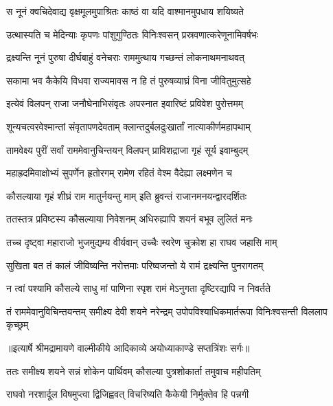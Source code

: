 \twolineshloka
{स नूनं क्वचिदेवाद्य वृक्षमूलमुपाश्रितः}
{काष्ठं वा यदि वाश्मानमुपधाय शयिष्यते} %

\twolineshloka
{उत्थास्यति च मेदिन्याः कृपणः पांशुगुण्ठितः}
{विनिःश्वसन् प्रस्रवणात्करेणूनामिवर्षभः} %

\twolineshloka
{द्रक्ष्यन्ति नूनं पुरुषा दीर्घबाहुं वनेचराः}
{राममुत्थाय गच्छन्तं लोकनाथमनाथवत्} %

\twolineshloka
{सकामा भव कैकेयि विधवा राज्यमावस}
{न हि तं पुरुषव्याघ्रं विना जीवितुमुत्सहे} %

\twolineshloka
{इत्येवं विलपन् राजा जनौघेनाभिसंवृतः}
{अपस्नात इवारिष्टं प्रविवेश पुरोत्तमम्} %

\twolineshloka
{शून्यचत्वरवेश्मान्तां संवृतापणदेवताम्}
{क्लान्तदुर्बलदुःखार्तां नात्याकीर्णमहापथाम्} %

\twolineshloka
{तामवेक्ष्य पुरीं सर्वां राममेवानुचिन्तयन्}
{विलपन् प्राविशद्राजा गृहं सूर्य इवाम्बुदम्} %

\twolineshloka
{महाह्रदमिवाक्षोभ्यं सुपर्णेन हृतोरगम्}
{रामेण रहितं वेश्म वैदेह्या लक्ष्मणेन च} %

\twolineshloka
{कौसल्याया गृहं शीघ्रं राम मातुर्नयन्तु माम्}
{इति ब्रुवन्तं राजानमनयन्द्वारदर्शितः} %

\twolineshloka
{ततस्तत्र प्रविष्टस्य कौसल्याया निवेशनम्}
{अधिरुह्यापि शयनं बभूव लुलितं मनः} %

\twolineshloka
{तच्च दृष्ट्वा महाराजो भुजमुद्यम्य वीर्यवान्}
{उच्चैः स्वरेण चुक्रोश हा राघव जहासि माम्} %

\twolineshloka
{सुखिता बत तं कालं जीविष्यन्ति नरोत्तमाः}
{परिष्वजन्तो ये रामं द्रक्ष्यन्ति पुनरागतम्} %

\twolineshloka
{न त्वां पश्यामि कौसल्ये साधु मां पाणिना स्पृश}
{रामं मेऽनुगता दृष्टिरद्यापि न निवर्तते} %

\fourlineindentedshloka
{तं राममेवानुविचिन्तयन्तम्}
{समीक्ष्य देवी शयने नरेन्द्रम्}
{उपोपविश्याधिकमार्तरूपा}
{विनिःश्वसन्ती विललाप कृच्छ्रम्} %


{॥इत्यार्षे श्रीमद्रामायणे वाल्मीकीये आदिकाव्ये अयोध्याकाण्डे सप्तत्रिंशः सर्गः॥}


\twolineshloka
{ततः समीक्ष्य शयने सन्नं शोकेन पार्थिवम्}
{कौसल्या पुत्रशोकार्ता तमुवाच महीपतिम्} %

\twolineshloka
{राघवो नरशार्दूल विषमुप्त्वा द्विजिह्ववत्}
{विचरिष्यति कैकेयी निर्मुक्तेव हि पन्नगी} %

